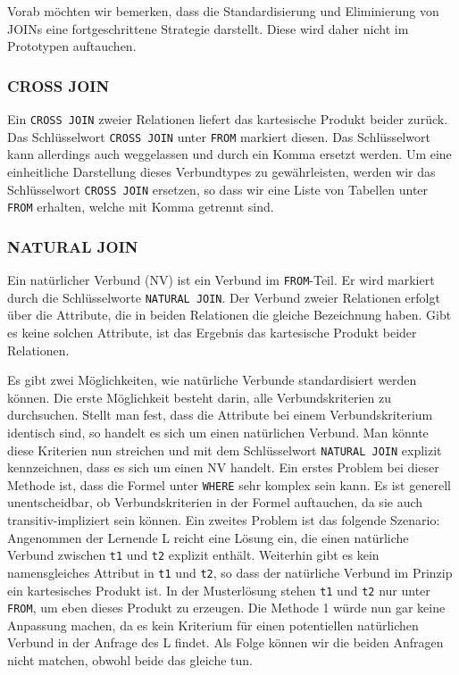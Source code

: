Vorab möchten wir bemerken, dass die Standardisierung und Eliminierung von JOINs eine fortgeschrittene Strategie darstellt. Diese wird daher nicht im Prototypen auftauchen.

\subsubsection*{CROSS JOIN}

Ein \verb|CROSS JOIN| zweier Relationen liefert das kartesische Produkt beider zurück. Das Schlüsselwort \verb|CROSS JOIN| unter \verb|FROM| markiert diesen. Das Schlüsselwort kann allerdings auch weggelassen und durch ein Komma ersetzt werden. Um eine einheitliche Darstellung dieses Verbundtypes zu gewährleisten, werden wir das Schlüsselwort \verb|CROSS JOIN| ersetzen, so dass wir eine Liste von Tabellen unter \verb|FROM| erhalten, welche mit Komma getrennt sind.

\subsubsection*{NATURAL JOIN}

Ein natürlicher Verbund (NV) ist ein Verbund im \verb|FROM|-Teil. Er wird markiert durch die Schlüsselworte \verb|NATURAL JOIN|. Der Verbund zweier Relationen erfolgt über die Attribute, die in beiden Relationen die gleiche Bezeichnung haben. Gibt es keine solchen Attribute, ist das Ergebnis das kartesische Produkt beider Relationen.

Es gibt zwei Möglichkeiten, wie natürliche Verbunde standardisiert werden können. Die erste Möglichkeit besteht darin,   alle Verbundskriterien zu durchsuchen. Stellt man fest, dass die Attribute bei einem Verbundskriterium identisch sind, so handelt es sich um einen natürlichen Verbund. Man könnte diese Kriterien nun streichen und mit dem Schlüsselwort \verb|NATURAL JOIN| explizit kennzeichnen, dass es sich um einen NV handelt. Ein erstes Problem bei dieser Methode ist, dass die Formel unter \verb|WHERE| sehr komplex sein kann. Es ist generell unentscheidbar, ob Verbundskriterien in der Formel auftauchen, da sie auch transitiv-impliziert sein können. Ein zweites Problem ist das folgende Szenario: Angenommen der Lernende L reicht eine Lösung ein, die einen natürliche Verbund zwischen \verb|t1| und \verb|t2| explizit enthält. Weiterhin gibt es kein namensgleiches Attribut in \verb|t1| und \verb|t2|, so dass der natürliche Verbund im Prinzip ein kartesisches Produkt ist. In der Musterlösung stehen \verb|t1| und \verb|t2| nur unter \verb|FROM|, um eben dieses Produkt zu erzeugen. Die Methode 1 würde nun gar keine Anpassung machen, da es kein Kriterium für einen potentiellen natürlichen Verbund in der Anfrage des L findet. Als Folge können wir die beiden Anfragen nicht matchen, obwohl beide das gleiche tun.


